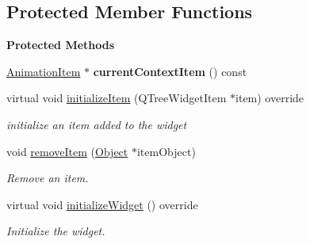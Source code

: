 \subsection*{Protected Member Functions}
\begin{Indent}\textbf{ Protected Methods}\par
\begin{DoxyCompactItemize}
\item 
\mbox{\label{classrev_1_1_view_1_1_animation_tree_widget_a7410f101696b288ba553630b4941e12c}} 
\mbox{\hyperlink{classrev_1_1_view_1_1_animation_item}{Animation\+Item}} $\ast$ {\bfseries current\+Context\+Item} () const
\item 
\mbox{\label{classrev_1_1_view_1_1_animation_tree_widget_a0eb2822233a40d9298e724217f53f505}} 
virtual void \mbox{\hyperlink{classrev_1_1_view_1_1_animation_tree_widget_a0eb2822233a40d9298e724217f53f505}{initialize\+Item}} (Q\+Tree\+Widget\+Item $\ast$item) override
\begin{DoxyCompactList}\small\item\em initialize an item added to the widget \end{DoxyCompactList}\item 
\mbox{\label{classrev_1_1_view_1_1_animation_tree_widget_a4fcd4bf338070d69760835ca53efff32}} 
void \mbox{\hyperlink{classrev_1_1_view_1_1_animation_tree_widget_a4fcd4bf338070d69760835ca53efff32}{remove\+Item}} (\mbox{\hyperlink{classrev_1_1_object}{Object}} $\ast$item\+Object)
\begin{DoxyCompactList}\small\item\em Remove an item. \end{DoxyCompactList}\item 
\mbox{\label{classrev_1_1_view_1_1_animation_tree_widget_aad984687e78eab75f8988f404ca490a3}} 
virtual void \mbox{\hyperlink{classrev_1_1_view_1_1_animation_tree_widget_aad984687e78eab75f8988f404ca490a3}{initialize\+Widget}} () override
\begin{DoxyCompactList}\small\item\em Initialize the widget. \end{DoxyCompactList}\end{DoxyCompactItemize}
\end{Indent}

